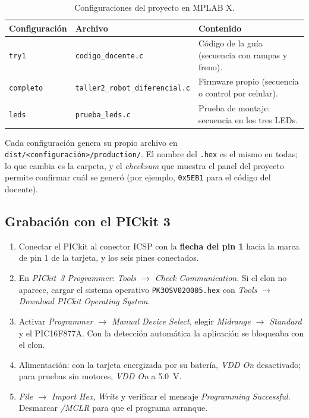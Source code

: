 \begin{table}[H]
  \centering
  \caption{Configuraciones del proyecto en MPLAB X.}
  \label{tab:configs}
  \small
  \begin{tabularx}{\textwidth}{@{}l l L@{}}
    \toprule
    \textbf{Configuración} & \textbf{Archivo} & \textbf{Contenido} \\
    \midrule
    \texttt{try1}     & \texttt{codigo\_docente.c} & Código de la guía (secuencia con rampas y freno). \\
    \texttt{completo} & \texttt{taller2\_robot\_diferencial.c} & Firmware propio (secuencia o control por celular). \\
    \texttt{leds}     & \texttt{prueba\_leds.c} & Prueba de montaje: secuencia en los tres LEDs. \\
    \bottomrule
  \end{tabularx}
\end{table}

Cada configuración genera su propio archivo en
\texttt{dist/<configuración>/production/}. El nombre del \texttt{.hex} es el
mismo en todas; lo que cambia es la carpeta, y el \emph{checksum} que muestra
el panel del proyecto permite confirmar cuál se generó (por ejemplo,
\texttt{0x5EB1} para el código del docente).

\subsection{Grabación con el PICkit 3}

\begin{enumerate}
  \item Conectar el PICkit al conector ICSP con la \textbf{flecha del pin 1}
        hacia la marca de pin 1 de la tarjeta, y los seis pines conectados.
  \item En \emph{PICkit~3 Programmer}: \emph{Tools $\rightarrow$ Check
        Communication}. Si el clon no aparece, cargar el sistema operativo
        \texttt{PK3OSV020005.hex} con \emph{Tools $\rightarrow$ Download
        PICkit Operating System}.
  \item Activar \emph{Programmer $\rightarrow$ Manual Device Select}, elegir
        \emph{Midrange $\rightarrow$ Standard} y el PIC16F877A. Con la
        detección automática la aplicación se bloqueaba con el clon.
  \item Alimentación: con la tarjeta energizada por su batería, \emph{VDD On}
        desactivado; para pruebas sin motores, \emph{VDD On} a
        \SI{5.0}{\volt}.
  \item \emph{File $\rightarrow$ Import Hex}, \emph{Write} y verificar el
        mensaje \emph{Programming Successful}. Desmarcar \emph{/MCLR} para que
        el programa arranque.
\end{enumerate}


